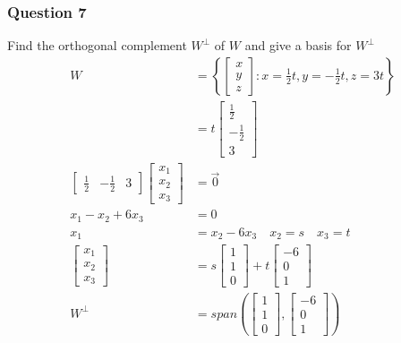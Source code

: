 \documentclass{math}
\begin{document}
\subsubsection*{Question 7}
Find the orthogonal complement \( W^{\bot} \) of \( W \) and give a basis for
\( W^{\bot} \)
\begin{align*}
  W &= \left\{\begin{bmatrix}x \\ y \\ z\end{bmatrix}: x = \frac{1}{2}t,
    y = -\frac{1}{2}t, z = 3t\right\} \\
  &= t\begin{bmatrix}\frac{1}{2} \\ -\frac{1}{2} \\ 3\end{bmatrix} \\
  \begin{bmatrix}\frac{1}{2} & -\frac{1}{2} & 3\end{bmatrix}
    \begin{bmatrix}x_1 \\ x_2 \\ x_3\end{bmatrix} &= \vec{0} \\
  x_1-x_2+6x_3 &= 0 \\
  x_1 &= x_2-6x_3 \quad x_2 = s \quad x_3 = t \\
  \begin{bmatrix}x_1 \\ x_2 \\ x_3\end{bmatrix} &=
    s\begin{bmatrix}1 \\ 1 \\ 0\end{bmatrix}+
    t\begin{bmatrix}-6 \\ 0 \\ 1\end{bmatrix} \\
  W^{\bot} &= span\left(
    \begin{bmatrix}1 \\ 1 \\ 0\end{bmatrix},
    \begin{bmatrix}-6 \\ 0 \\ 1\end{bmatrix}
  \right)
\end{align*}
\end{document}

